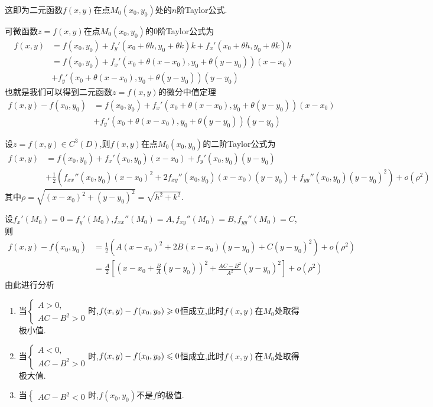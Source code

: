 这即为二元函数$f(x,y)$在点$M_0(x_0,y_0)$处的$n$阶Taylor公式.

\begin{example}
    可微函数$z = f(x,y)$在点$M_0(x_0,y_0)$的0阶Taylor公式为
    \begin{align*}
        f(x,y) &= f(x_0,y_0) + f_y'(x_0 + \theta h,y_0 + \theta k) k + f_x'(x_0 + \theta h,y_0 + \theta k)h\\
        &= f(x_0,y_0) + f_x'\left(x_0 + \theta(x-x_0),y_0 + \theta(y-y_0)\right)(x-x_0) \\
        &+ f_y'\left(x_0 + \theta(x-x_0),y_0 + \theta(y-y_0)\right)(y-y_0)
    \end{align*}
    也就是我们可以得到二元函数$z =f(x,y) $的微分中值定理
    \begin{align*}
        f(x,y)-f(x_0,y_0) &= f(x_0,y_0) + f_x'\left(x_0 + \theta(x-x_0),y_0 + \theta(y-y_0)\right)(x-x_0)\\&+ f_y'\left(x_0 + \theta(x-x_0),y_0 + \theta(y-y_0)\right)(y-y_0)
    \end{align*}

\end{example}

\begin{example}
设$z =f(x,y) \in C^3(D)$,则$f(x,y)$在点$M_0(x_0,y_0)$的二阶Taylor公式为
\begin{align*}
    f(x,y) &= f(x_0,y_0) + f_x'(x_0,y_0)(x-x_0) + f_y'(x_0,y_0)(y-y_0)\\
    &+ \frac{1}{2} \left( f_{xx}''(x_0,y_0)(x-x_0)^2 + 2f_{xy}''(x_0,y_0)(x-x_0)(y-y_0) + f_{yy}''(x_0,y_0)(y-y_0)^2 \right) + o(\rho^2)    
\end{align*}
其中$\rho = \sqrt{(x-x_0)^2 + (y-y_0)^2} = \sqrt{h^2 + k^2}$.

设$f_x'(M_0) = 0 = f_y'(M_0)$,$f_{xx}''(M_0) = A, f_{xy}''(M_0) = B, f_{yy}''(M_0) = C$,则
\begin{align*}
    f(x,y) - f(x_0,y_0) &= \frac12 \left( A(x-x_0)^2 + 2B(x-x_0)(y-y_0) + C(y-y_0)^2 \right) + o(\rho^2)\\
    &= \frac{A}{2} \left[ \left(x-x_0 + \frac{B}{A}(y-y_0) \right)^2 + \frac{AC-B^2}{A^2}(y-y_0)^2 \right] + o(\rho^2)
\end{align*}
由此进行分析
\begin{enumerate}
    \item 当$\begin{cases}
        A > 0,\\
        AC - B^2 > 0
    \end{cases}$时,$f(x,y) - f(x_0,y_0) \geqslant 0$恒成立,此时$f(x,y)$在$M_0$处取得极小值.
    \item 当$\begin{cases}
        A < 0,\\
        AC - B^2 > 0
    \end{cases}$时,$f(x,y) - f(x_0,y_0) \leqslant 0$恒成立,此时$f(x,y)$在$M_0$处取得极大值.
    \item 当$\begin{cases}
        AC - B^2 < 0
    \end{cases}$时,$f(x_0,y_0)$不是$f$的极值.
\end{enumerate}
\end{example}

